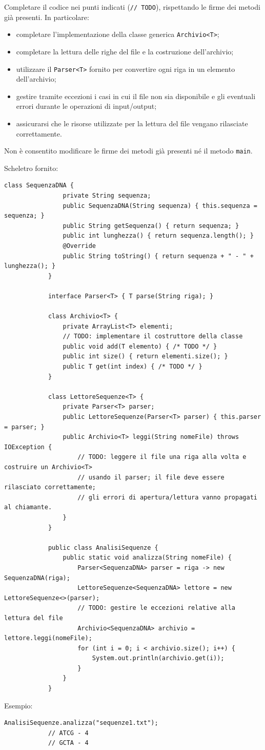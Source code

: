 \begin{enumerate}
		Completare il codice nei punti indicati (\texttt{// TODO}), rispettando le firme dei metodi già presenti. In particolare:
		\begin{itemize}
			\item completare l'implementazione della classe generica \texttt{Archivio<T>};
			\item completare la lettura delle righe del file e la costruzione dell'archivio;
			\item utilizzare il \texttt{Parser<T>} fornito per convertire ogni riga in un elemento dell'archivio;
			\item gestire tramite eccezioni i casi in cui il file non sia disponibile e gli eventuali errori durante le operazioni di input/output;
			\item assicurarsi che le risorse utilizzate per la lettura del file vengano rilasciate correttamente.
		\end{itemize}
		Non è consentito modificare le firme dei metodi già presenti né il metodo \texttt{main}.
		
		Scheletro fornito:
		\begin{lstlisting}[style=java]
			class SequenzaDNA {
				private String sequenza;
				public SequenzaDNA(String sequenza) { this.sequenza = sequenza; }
				public String getSequenza() { return sequenza; }
				public int lunghezza() { return sequenza.length(); }
				@Override
				public String toString() { return sequenza + " - " + lunghezza(); }
			}
			
			interface Parser<T> { T parse(String riga); }
			
			class Archivio<T> {
				private ArrayList<T> elementi;
				// TODO: implementare il costruttore della classe
				public void add(T elemento) { /* TODO */ }
				public int size() { return elementi.size(); }
				public T get(int index) { /* TODO */ }
			}
			
			class LettoreSequenze<T> {
				private Parser<T> parser;
				public LettoreSequenze(Parser<T> parser) { this.parser = parser; }
				public Archivio<T> leggi(String nomeFile) throws IOException {
					// TODO: leggere il file una riga alla volta e costruire un Archivio<T>
					// usando il parser; il file deve essere rilasciato correttamente;
					// gli errori di apertura/lettura vanno propagati al chiamante.
				}
			}
			
			public class AnalisiSequenze {
				public static void analizza(String nomeFile) {
					Parser<SequenzaDNA> parser = riga -> new SequenzaDNA(riga);
					LettoreSequenze<SequenzaDNA> lettore = new LettoreSequenze<>(parser);
					// TODO: gestire le eccezioni relative alla lettura del file
					Archivio<SequenzaDNA> archivio = lettore.leggi(nomeFile);
					for (int i = 0; i < archivio.size(); i++) {
						System.out.println(archivio.get(i));
					}
				}
			}
		\end{lstlisting}
		
		Esempio:
		\begin{lstlisting}[style=java]
			AnalisiSequenze.analizza("sequenze1.txt");
			// ATCG - 4
			// GCTA - 4
		\end{lstlisting}
	\end{enumerate}
	
